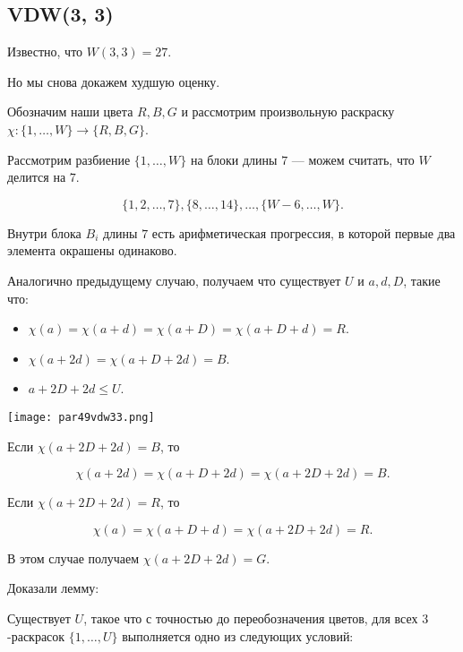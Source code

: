 \begin{normalsize}

\subsection{VDW(3, 3)}

Известно, что $W(3, 3) = 27$.

Но мы снова докажем худшую оценку.

Обозначим наши цвета $R, B, G$ и рассмотрим произвольную раскраску $\chi: \{1, \ldots, W\} \to \{R, B, G\}$.

Рассмотрим разбиение $\{1, \ldots, W\}$ на блоки длины $7$ --- можем считать, что $W$ делится на $7$.

\[ \{1, 2, \ldots, 7\}, \{8, \ldots, 14\}, \ldots, \{W-6, \ldots, W\}. \]

Внутри блока $B_i$ длины $7$ есть арифметическая прогрессия, в которой первые два элемента окрашены одинаково.

Аналогично предыдущему случаю, получаем что существует $U$ и $a, d, D$, такие что:

\begin{itemize}
    \item $\chi(a) = \chi(a + d) = \chi(a + D) = \chi(a + D + d) = R$.
    
    \item $\chi(a + 2d) = \chi(a + D + 2d) = B$.
    
    \item $a + 2D + 2d \leq U$.
\end{itemize}

\begin{center}
    \texttt{[image: par49vdw33.png]}
\end{center}

Если $\chi(a + 2D + 2d) = B$, то 

\[ \chi(a + 2d) = \chi(a + D + 2d) = \chi(a + 2D + 2d) = B. \]

Если $\chi(a + 2D + 2d) = R$, то

\[ \chi(a) = \chi(a + D + d) = \chi(a + 2D + 2d) = R. \]

В этом случае получаем $\chi(a + 2D + 2d) = G$.

Доказали лемму:

\begin{lemma}
    Существует $U$, такое что с точностью до переобозначения цветов, для всех $3$-раскрасок $\{1, \ldots, U\}$ выполняется одно из следующих условий:


\end{lemma}
\end{normalsize}
